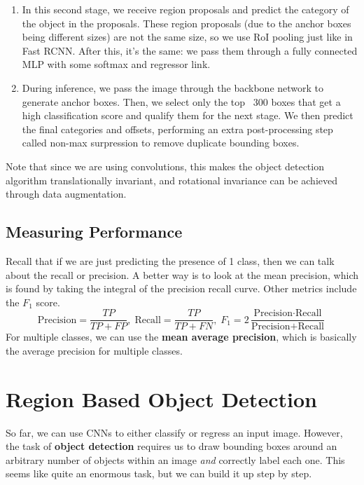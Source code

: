 \documentclass{article}
\begin{document}
\begin{enumerate}
        \item In this second stage, we receive region proposals and predict the category of the object in the proposals. These region proposals (due to the anchor boxes being different sizes) are not the same size, so we use RoI pooling just like in Fast RCNN. After this, it's the same: we pass them through a fully connected MLP with some softmax and regressor link. 

        \item During inference, we pass the image through the backbone network to generate anchor boxes. Then, we select only the top ~300 boxes that get a high classification score and qualify them for the next stage. We then predict the final categories and offsets, performing an extra post-processing step called non-max surpression to remove duplicate bounding boxes. 
    \end{enumerate}

    Note that since we are using convolutions, this makes the object detection algorithm translationally invariant, and rotational invariance can be achieved through data augmentation. 

  \subsection{Measuring Performance} 

    Recall that if we are just predicting the presence of 1 class, then we can talk about the recall or precision. A better way is to look at the mean precision, which is found by taking the integral of the precision recall curve. Other metrics include the $F_1$ score. 
    \[\text{Precision} = \frac{TP}{TP + FP}, \; \text{Recall} = \frac{TP}{TP + FN}, \; F_1 = 2 \frac{\text{Precision} \cdot \text{Recall}}{\text{Precision} + \text{Recall}}\]
    For multiple classes, we can use the \textbf{mean average precision}, which is basically the average precision for multiple classes.

\section{Region Based Object Detection}

  So far, we can use CNNs to either classify or regress an input image. However, the task of \textbf{object detection} requires us to draw bounding boxes around an arbitrary number of objects within an image \textit{and} correctly label each one. This seems like quite an enormous task, but we can build it up step by step. 
\end{document}
